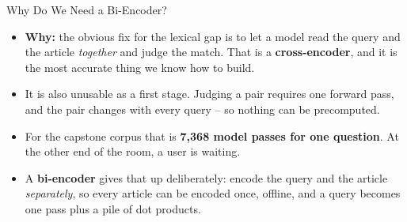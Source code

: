 \begin{frame}{Why Do We Need a Bi-Encoder?}
\begin{itemize}
  \item \textbf{Why:} the obvious fix for the lexical gap is to let a model read the query and the article \emph{together} and judge the match. That is a \textbf{cross-encoder}, and it is the most accurate thing we know how to build.
  \pause
  \item It is also unusable as a first stage. Judging a pair requires one forward pass, and the pair changes with every query -- so nothing can be precomputed.
  \pause
  \item For the capstone corpus that is \textbf{7{,}368 model passes for one question}. At the other end of the room, a user is waiting.
  \pause
  \item A \textbf{bi-encoder} gives that up deliberately: encode the query and the article \emph{separately}, so every article can be encoded once, offline, and a query becomes one pass plus a pile of dot products.
\end{itemize}
\end{frame}


